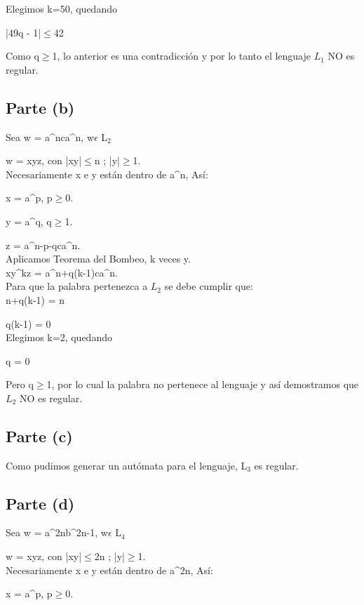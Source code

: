 \documentclass[11pt,letterpaper]{article}
\begin{document}
Elegimos k=50, quedando

|49q - 1|$\leqslant$42

Como q$\geqslant$1, lo anterior es una contradicción y por lo tanto el lenguaje $L_{1}$ NO es regular.


\subsection{Parte (b)}
Sea w = a^nca^n, w$ \epsilon $ L$_{2}$

w = xyz, con |xy|$\leqslant$n ; |y|$\geqslant$1.
 \\

Necesariamente x e y están dentro de a^n, As$í$:

x = a^p, p$\geqslant$0.

y = a^q, q$\geqslant$1.

z = a^{n-p-q}ca^n.
 \\

Aplicamos Teorema del Bombeo, k veces y.
 \\
 
xy^kz = a^{n+q(k-1)}ca^n.
 \\

Para que la palabra pertenezca a $L_{2}$ se debe cumplir que:
 \\
 
n+q(k-1) = n

q(k-1) = 0
 \\
 
Elegimos k=2, quedando

q = 0

Pero q$\geqslant$1, por lo cual la palabra no pertenece al lenguaje y así demostramos que $L_{2}$ NO es regular.

\subsection{Parte (c)}
Como pudimos generar un aut$ó$mata para el lenguaje, L$_{3}$ es regular.


\subsection{Parte (d)}
Sea w = a^{2n}b^{2n-1}, w$ \epsilon $ L$_{4}$

w = xyz, con |xy|$\leqslant$2n ; |y|$\geqslant$1.
 \\

Necesariamente x e y están dentro de a^{2n}, As$í$:

x = a^p, p$\geqslant$0.
\end{document}
